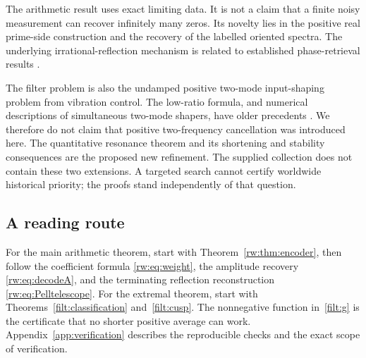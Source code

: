The arithmetic result uses exact limiting data. It is not a claim that a
finite noisy measurement can recover infinitely many zeros. Its novelty
lies in the positive real prime-side construction and the recovery of
the labelled oriented spectra. The underlying irrational-reflection
mechanism is related to established phase-retrieval results
\cite{Liehr2024,Wellershoff2024}.

The filter problem is also the undamped positive two-mode input-shaping
problem from vibration control. The low-ratio formula, and numerical
descriptions of simultaneous two-mode shapers, have older precedents
\cite{Singhose1997,Crain1996}. We therefore do not claim that positive
two-frequency cancellation was introduced here. The quantitative
resonance theorem and its shortening and stability consequences are
the proposed new refinement. The supplied collection does not contain
these two extensions. A targeted search cannot certify worldwide
historical priority; the proofs stand independently of that question.

\subsection{A reading route}

For the main arithmetic theorem, start with
Theorem~\ref{rw:thm:encoder}, then follow the coefficient formula
\eqref{rw:eq:weight}, the amplitude recovery
\eqref{rw:eq:decodeA}, and the terminating reflection reconstruction
\eqref{rw:eq:Pelltelescope}. For the extremal theorem, start with
Theorems~\ref{filt:classification} and~\ref{filt:cusp}.
The nonnegative function in~\eqref{filt:g} is the certificate that
no shorter positive average can work. Appendix~\ref{app:verification}
describes the reproducible checks and the exact scope of verification.
